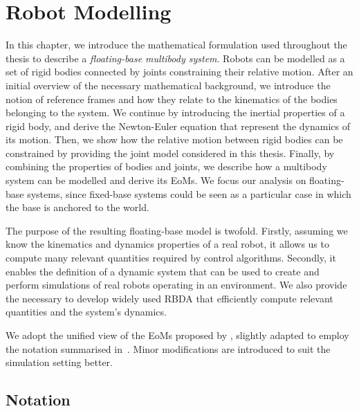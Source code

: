 \acresetall
\chapter{Robot Modelling}
\label{ch:robot_modelling}

In this chapter, we introduce the mathematical formulation used throughout the thesis to describe a \emph{floating-base multibody system}.
Robots can be modelled as a set of rigid bodies connected by joints constraining their relative motion.
After an initial overview of the necessary mathematical background, we introduce the notion of reference frames and how they relate to the kinematics of the bodies belonging to the system.
We continue by introducing the inertial properties of a rigid body, and derive the Newton-Euler equation that represent the dynamics of its motion.
Then, we show how the relative motion between rigid bodies can be constrained by providing the joint model considered in this thesis.
Finally, by combining the properties of bodies and joints, we describe how a multibody system can be modelled and derive its \aclp{EoM}.
We focus our analysis on floating-base systems, since fixed-base systems could be seen as a particular case in which the base is anchored to the world.

The purpose of the resulting floating-base model is twofold.
Firstly, assuming we know the kinematics and dynamics properties of a real robot, it allows us to compute many relevant quantities required by control algorithms.
Secondly, it enables the definition of a dynamic system that can be used to create and perform simulations of real robots operating in an environment.
We also provide the necessary to develop widely used \ac{RBDA} that efficiently compute relevant quantities and the system's dynamics.

We adopt the unified view of the \acp{EoM} proposed by \textcite{traversaro_unied_2017}, slightly adapted to employ the notation summarised in~\textcite{traversaro_multibody_2019}.
Minor modifications are introduced to suit the simulation setting better.

\section{Notation}


